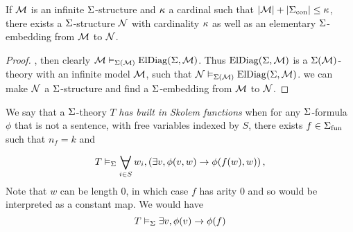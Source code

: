 \begin{prop}
    If $\mathcal{M}$ is an infinite $\Sigma$-structure 
    and $\kappa$ a cardinal such that 
    $|{\mathcal{M}}|+ |{\Sigma}_\mathrm{con}| \leq \kappa$,
    there exists a $\Sigma$-structure $\mathcal{N}$ with cardinality 
    $\kappa$ as well as an elementary 
    $\Sigma$-embedding from $\mathcal{M}$ to $\mathcal{N}$.
\end{prop}
\begin{proof}
    ,
    then clearly $\mathcal{M} \vDash_{\Sigma(\mathcal{M})} \mathrm{ElDiag}(\Sigma,\mathcal{M})$.
    Thus $\mathrm{ElDiag}(\Sigma,\mathcal{M})$ is a 
    $\Sigma(\mathcal{M})$-theory with an infinite model $\mathcal{M}$,
    such that $\mathcal{N} \vDash_{\Sigma(\mathcal{M})} \mathrm{ElDiag}(\Sigma,\mathcal{M})$.
    we can make $\mathcal{N}$ a $\Sigma$-structure and find a 
    $\Sigma$-embedding from $\mathcal{M}$ to $\mathcal{N}$.
\end{proof}

\begin{dfn}
    We say that a $\Sigma$-theory $T$ 
    \emph{has built in Skolem functions} when for any $\Sigma$-formula $\phi$
    that is not a sentence, 
    with free variables indexed by $S$,
    there exists $f \in {\Sigma}_\mathrm{fun}$ such that $n_f = k$ and 
    \[T \model{\Si} \bigforall{i \in S}{} w_i, 
        \brkt{\exists v, \phi(v,w) \to \phi(f(w),w)},\]
    Note that $w$ can be length $0$, 
    in which case $f$ has arity $0$ 
    and so would be interpreted as a constant map.
    We would have 
    \[T \vDash_{\Sigma}  
        \exists v, \phi(v) \to \phi(f)\]
\end{dfn}

